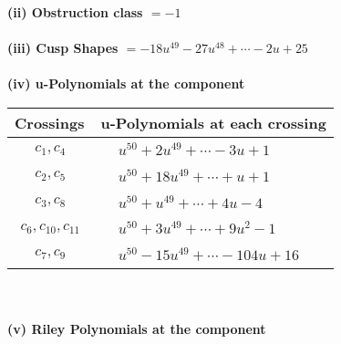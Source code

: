 \documentclass[1p]{elsarticle_modified}
\theoremstyle{definition}
\begin{document}
\flushleft \textbf{(ii) Obstruction class $= -1$}\\~\\
\flushleft \textbf{(iii) Cusp Shapes $= -18 u^{49}-27 u^{48}+\cdots-2 u+25$}\\~\\
\newpage\renewcommand{\arraystretch}{1}
\flushleft \textbf{(iv) u-Polynomials at the component}\newline \\
\begin{tabular}{m{50pt}|m{274pt}}
Crossings & \hspace{64pt}u-Polynomials at each crossing \\
\hline $$\begin{aligned}c_{1},c_{4}\end{aligned}$$&$\begin{aligned}
&u^{50}+2 u^{49}+\cdots-3 u+1
\end{aligned}$\\
\hline $$\begin{aligned}c_{2},c_{5}\end{aligned}$$&$\begin{aligned}
&u^{50}+18 u^{49}+\cdots+u+1
\end{aligned}$\\
\hline $$\begin{aligned}c_{3},c_{8}\end{aligned}$$&$\begin{aligned}
&u^{50}+u^{49}+\cdots+4 u-4
\end{aligned}$\\
\hline $$\begin{aligned}c_{6},c_{10},c_{11}\end{aligned}$$&$\begin{aligned}
&u^{50}+3 u^{49}+\cdots+9 u^2-1
\end{aligned}$\\
\hline $$\begin{aligned}c_{7},c_{9}\end{aligned}$$&$\begin{aligned}
&u^{50}-15 u^{49}+\cdots-104 u+16
\end{aligned}$\\
\hline
\end{tabular}\\~\\
\newpage\renewcommand{\arraystretch}{1}
\flushleft \textbf{(v) Riley Polynomials at the component}\newline \\
\end{document}
